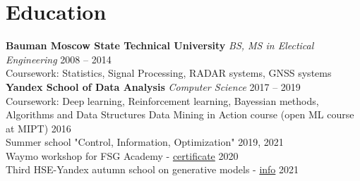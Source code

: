 \section*{\sectionformat Education}
\textbf{Bauman Moscow State Technical University} \textit{BS, MS in Electical Engineering} \hfill 2008 -- 2014 \\
Coursework: Statistics, Signal Processing, RADAR systems, GNSS systems \\
% 
\textbf{Yandex School of Data Analysis} \textit{Computer Science} \hfill 2017 -- 2019 \\
Coursework: Deep learning, Reinforcement learning, Bayessian methods, Algorithms and Data Structures
% 
\horizontalline
Data Mining in Action course (open ML course at MIPT)                                                                                   \hfill    2016         \\
Summer school "Control, Information, Optimization"                                                                                        \hfill  2019, 2021   \\
Waymo workshop for FSG Academy - \href{https://drive.google.com/file/d/1-WxECccxBrRWIvEt9WQeXKTueiF658r7/view?usp=sharing}{certificate}   \hfill  2020         \\
Third HSE-Yandex autumn school on generative models - \href{https://indico.cern.ch/event/1082512/timetable/#20211123}{info}               \hfill  2021         \\